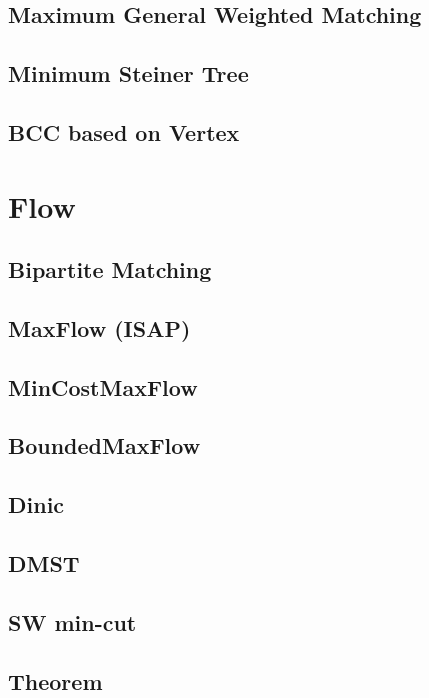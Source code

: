 \documentclass[a4paper,10pt,twocolumn,oneside]{article}
\begin{document}
\subsection{Maximum General Weighted Matching}

\subsection{Minimum Steiner Tree}

\subsection{BCC based on Vertex}


\section{Flow}
\subsection{Bipartite Matching}

\subsection{MaxFlow (ISAP)}

\subsection{MinCostMaxFlow}

\subsection{BoundedMaxFlow}

\subsection{Dinic}

\subsection{DMST}

\subsection{SW min-cut}

\subsection{Theorem}

\end{document}
